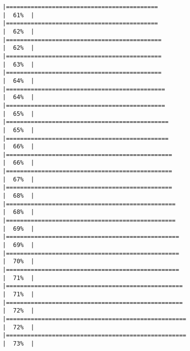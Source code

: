 \documentclass[
]{article}
\begin{document}
\begin{verbatim}
|===========================================                           |  61%  |                                                                              |===========================================                           |  62%  |                                                                              |============================================                          |  62%  |                                                                              |============================================                          |  63%  |                                                                              |============================================                          |  64%  |                                                                              |=============================================                         |  64%  |                                                                              |=============================================                         |  65%  |                                                                              |==============================================                        |  65%  |                                                                              |==============================================                        |  66%  |                                                                              |===============================================                       |  66%  |                                                                              |===============================================                       |  67%  |                                                                              |===============================================                       |  68%  |                                                                              |================================================                      |  68%  |                                                                              |================================================                      |  69%  |                                                                              |=================================================                     |  69%  |                                                                              |=================================================                     |  70%  |                                                                              |=================================================                     |  71%  |                                                                              |==================================================                    |  71%  |                                                                              |==================================================                    |  72%  |                                                                              |===================================================                   |  72%  |                                                                              |===================================================                   |  73%  |                                                                              
\end{verbatim}
\end{document}
